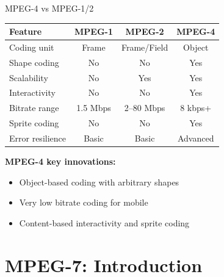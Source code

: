 \documentclass[aspectratio=169,12pt]{beamer}
\begin{document}
\begin{frame}{MPEG-4 vs MPEG-1/2}
    \begin{center}
        \begin{tabular}{l|c|c|c}
            \toprule
            \textbf{Feature} & \textbf{MPEG-1} & \textbf{MPEG-2} & \textbf{MPEG-4} \\
            \midrule
            Coding unit & Frame & Frame/Field & Object \\
            Shape coding & No & No & Yes \\
            Scalability & No & Yes & Yes \\
            Interactivity & No & No & Yes \\
            Bitrate range & 1.5 Mbps & 2--80 Mbps & 8 kbps+ \\
            Sprite coding & No & No & Yes \\
            Error resilience & Basic & Basic & Advanced \\
            \bottomrule
        \end{tabular}
    \end{center}
    
    \vspace{0.3cm}
    \textbf{MPEG-4 key innovations:}
    \begin{itemize}
        \item Object-based coding with arbitrary shapes
        \item Very low bitrate coding for mobile
        \item Content-based interactivity and sprite coding
    \end{itemize}
\end{frame}


\section{MPEG-7: Introduction}
\end{document}
